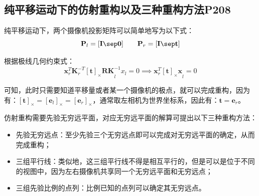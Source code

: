 \documentclass[11pt]{article}
\begin{document}
\subsection{纯平移运动下的仿射重构以及三种重构方法P208}
纯平移运动下，两个摄像机投影矩阵可以简单地写为以下式：
\begin{equation*}
  \mathbf{P}_l=
    [\mathbf{I\sep 0}]
\qquad\mathbf{P}_r=[\mathbf{I\sep t}]
\end{equation*}\par
根据极线几何约束式：
\begin{equation*}
  \mathbf{x}_r^T\mathbf{K}_r^{-T}\mathbf{[t]_\times RK}_l^{-1}x_l=0\implies\mathbf{x}_r^T\mathbf{[t]_\times x}_l=0
\end{equation*}\par
可知，此时只需要知道平移量或者某一个摄像机的极点，就可以完成重构，因为有：$\mathbf{[t]_\times=[e_\mathit{l}]_\times=[e_\mathit{r}]_\times}$，通常取左相机为世界坐标系，因此有：$\mathbf{t=e}_\mathit{r}$。\par
仿射重构需要先验无穷远平面，对应无穷远平面的解算可提出以下三种重构方法：
\begin{itemize}
  \item 先验无穷远点：至少先验三个无穷远点即可以完成对无穷远平面的确定，从而完成重构；
  \item 三组平行线：类似地，这三组平行线不得是相互平行的，但是可以是位于不同的视图中，因为左右摄像机共享同一个无穷远平面和无穷远点；
  \item 三组先验比例的点列：比例已知的点列可以确定其无穷远点。
\end{itemize}
\end{document}
